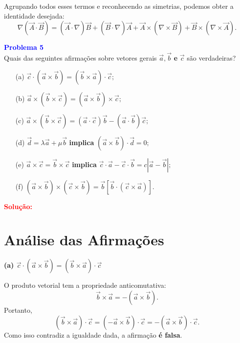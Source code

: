 \documentclass[a4paper,12pt]{article}
\begin{document}
\begin{flushleft}
\begin{itemize}
        Agrupando todos esses termos e reconhecendo as simetrias, podemos obter a identidade desejada:
        \begin{equation}
        \nabla (\vec{A} \cdot \vec{B}) = (\vec{A} \cdot \nabla) \vec{B} + (\vec{B} \cdot \nabla) \vec{A} + \vec{A} \times (\nabla \times \vec{B}) + \vec{B} \times (\nabla \times \vec{A}).
        \end{equation}
    \end{itemize}
\end{flushleft}

\begin{flushleft}
\textbf{\textcolor{blue}{Problema 5}}\\

Quais das seguintes afirmações sobre vetores gerais $\vec{a}, \vec{b}$ \textbf{e} $\vec{c}$ são verdadeiras?

\begin{enumerate}
    \item[(a)] $\vec{c} \cdot (\vec{a} \times \vec{b}) = (\vec{b} \times \vec{a}) \cdot \vec{c};$
    \item[(b)] $\vec{a} \times (\vec{b} \times \vec{c}) = (\vec{a} \times \vec{b}) \times \vec{c};$
    \item[(c)] $\vec{a} \times (\vec{b} \times \vec{c}) = (\vec{a} \cdot \vec{c})\vec{b} - (\vec{a} \cdot \vec{b})\vec{c};$
    \item[(d)] $\vec{d} = \lambda \vec{a} + \mu \vec{b}$ \textbf{implica} $(\vec{a} \times \vec{b}) \cdot \vec{d} = 0;$
    \item[(e)] $\vec{a} \times \vec{c} = \vec{b} \times \vec{c}$ \textbf{implica} $\vec{c} \cdot \vec{a} - \vec{c} \cdot \vec{b} = c |\vec{a} - \vec{b}|;$
    \item[(f)] $(\vec{a} \times \vec{b}) \times (\vec{c} \times \vec{b}) = \vec{b} [\vec{b} \cdot (\vec{c} \times \vec{a})].$
\end{enumerate}

\textcolor{red}{\textbf{Solução:}}\\

\section*{Análise das Afirmações}

\textbf{(a) $\vec{c} \cdot (\vec{a} \times \vec{b}) = (\vec{b} \times \vec{a}) \cdot \vec{c}$}

O produto vetorial tem a propriedade anticomutativa:
\begin{equation}
    \vec{b} \times \vec{a} = - (\vec{a} \times \vec{b}).
\end{equation}
Portanto,
\begin{equation}
    (\vec{b} \times \vec{a}) \cdot \vec{c} = (- \vec{a} \times \vec{b}) \cdot \vec{c} = - (\vec{a} \times \vec{b}) \cdot \vec{c}.
\end{equation}
Como isso contradiz a igualdade dada, a afirmação \textbf{é falsa}.


\end{flushleft}
\end{document}
